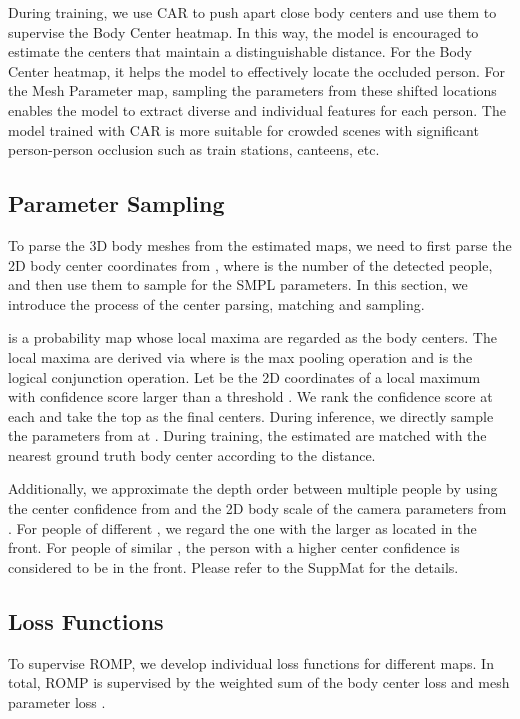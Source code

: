 \documentclass[10pt,twocolumn,letterpaper]{article}
\begin{document}
During training, we use CAR to push apart close body centers and use them to supervise the Body Center heatmap. 
In this way, the model is encouraged to estimate the  centers that maintain a distinguishable distance.
For the Body Center heatmap, it helps the model to effectively locate the occluded person.
For the Mesh Parameter map, sampling the parameters from these shifted locations enables the model to extract diverse and individual features for each person.
The model trained with CAR is more suitable for crowded scenes with significant person-person occlusion such as train stations, canteens, etc.


\subsection{Parameter Sampling~\label{sec:parameter sampling}}


To parse the 3D body meshes from the estimated maps, we need to first parse the 2D body center coordinates  from , where  is the number of the detected people, and then use them to sample  for the SMPL parameters. 
In this section, we introduce the process of the center parsing, matching and sampling. 

 is a probability map whose local maxima are regarded as the body centers. 
The local maxima are derived via  where  is the max pooling operation and  is the logical conjunction operation. 
Let  be the 2D coordinates of a local maximum with confidence score larger than a threshold . 
We rank the confidence score at each  and take the top  as the final centers.
During inference, we directly sample the parameters from  at . 
During training, the estimated  are matched with the nearest ground truth body center according to the  distance. 

Additionally, we approximate the depth order between multiple people by using the center confidence from  and the 2D body scale  of the camera parameters from .
For people of different , we regard the one with the larger  as located in the front.
For people of similar , the person with a higher center confidence is considered to be in the front. Please refer to the SuppMat for the details.


\subsection{Loss Functions}

To supervise ROMP, we develop individual loss functions for different maps.
In total, ROMP is supervised by the weighted sum of the body center loss  and mesh parameter loss .
\end{document}
